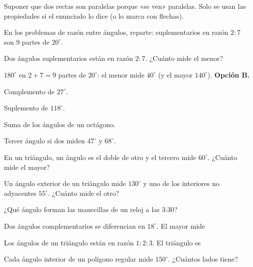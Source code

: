 \begin{trampa}
Suponer que dos rectas son paralelas porque «se ven» paralelas. Solo se usan las propiedades si el enunciado lo dice
(o lo marca con flechas).
\end{trampa}

\begin{atajo}
En los problemas de razón entre ángulos, reparte: suplementarios en razón $2 : 7$ son 9 partes de $20^\circ$.
\end{atajo}

\begin{reto}
Dos ángulos suplementarios están en razón $2 : 7$. ¿Cuánto mide el menor?
\end{reto}

\begin{retoresuelto}
$180^\circ$ en $2 + 7 = 9$ partes de $20^\circ$: el menor mide $40^\circ$ (y el mayor $140^\circ$). \textbf{Opción B.}
\end{retoresuelto}

\taller
{}
\begin{ejercicios}[2]
\item Complemento de $27^\circ$. 
\item Suplemento de $118^\circ$. 
\item Suma de los ángulos de un octágono. 
\item Tercer ángulo si dos miden $47^\circ$ y $68^\circ$. 
\end{ejercicios}
\begin{ejercicios}
\item En un triángulo, un ángulo es el doble de otro y el tercero mide $60^\circ$. ¿Cuánto mide el mayor? 
\item Un ángulo exterior de un triángulo mide $130^\circ$ y uno de los interiores no adyacentes $55^\circ$. ¿Cuánto mide el otro? 
\item ¿Qué ángulo forman las manecillas de un reloj a las 3:30? 
\end{ejercicios}
\begin{ejercicios}
\item Dos ángulos complementarios se diferencian en $18^\circ$. El mayor mide
\item Los ángulos de un triángulo están en razón $1 : 2 : 3$. El triángulo es
\item Cada ángulo interior de un polígono regular mide $150^\circ$. ¿Cuántos lados tiene?
\end{ejercicios}


